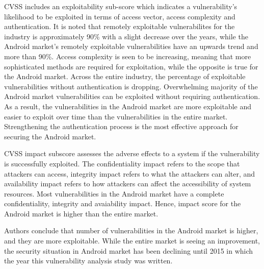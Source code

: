 \documentclass[
  a4paper,  %
  twoside,  %
  bibliography=totoc,
  headsepline,
  cleardoublepage=empty,
  parskip=half,
  draft=false,
  open=any
]{scrbook}
\begin{document}
CVSS includes an exploitability sub-score which indicates a vulnerability's likelihood to be exploited in terms of access vector, access complexity and authentication. It is noted that remotely exploitable vulnerabilites for the industry is approximately 90\% with a slight decrease over the years, while the Android market's remotely exploitable vulnerabilities have an upwards trend and more than 90\%. Access complexity is seen to be increasing, meaning that more sophisticated methods are required for exploitation, while the opposite is true for the Android market. Across the entire industry, the percentage of exploitable vulnerabilities without authentication is dropping. Overwhelming majority of the Android market vulnerabilities can be exploited without requiring authentication. As a result, the vulnerabilities in the Android market are more exploitable and easier to exploit over time than the vulnerabilities in the entire market. Strengthening the authentication process is the most effective approach for securing the Android market.

CVSS impact subscore assesses the adverse effects to a system if the vulnerability is successfully exploited. The confidentiality impact refers to the scope that attackers can access, integrity impact refers to what the attackers can alter, and availability impact refers to how attackers can affect the accessibility of system resources. Most vulnerabilities in the Android market have a complete confidentiality, integrity and avaiability impact. Hence, impact score for the Android market is higher than the entire market.

Authors conclude that number of vulnerabilities in the Android market is higher, and they are more exploitable. While the entire market is seeing an improvement, the security situation in Android market has been declining until 2015 in which the year this vulnerability analysis study was written. 
\end{document}
